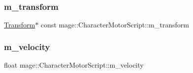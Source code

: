 \subsubsection{\texorpdfstring{m\+\_\+transform}{m\_transform}}
{\footnotesize\ttfamily \hyperlink{structmage_1_1_transform}{Transform}$\ast$ const mage\+::\+Character\+Motor\+Script\+::m\+\_\+transform\hspace{0.3cm}{\ttfamily [private]}}

\hypertarget{classmage_1_1_character_motor_script_a02441cc4c84ba12811845b7f966f4069}{}\label{classmage_1_1_character_motor_script_a02441cc4c84ba12811845b7f966f4069} 
\subsubsection{\texorpdfstring{m\+\_\+velocity}{m\_velocity}}
{\footnotesize\ttfamily float mage\+::\+Character\+Motor\+Script\+::m\+\_\+velocity\hspace{0.3cm}{\ttfamily [private]}}

